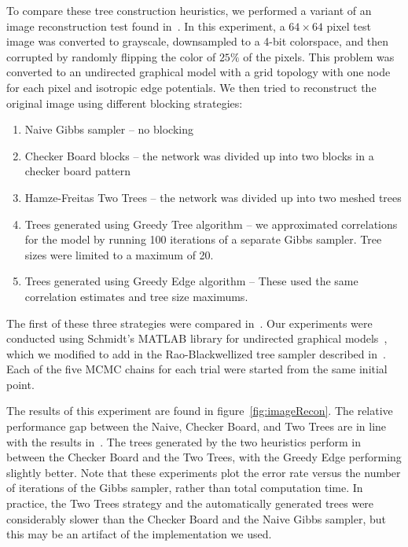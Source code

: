 \documentclass{article} %
\begin{document}

To compare these tree construction heuristics, we performed a variant of an
image reconstruction test found in~\cite{hamze2004fields}. In this experiment,
a $64\times64$ pixel test image was converted to grayscale, downsampled to a
4-bit colorspace, and then corrupted by randomly flipping the color of $25\%$
of the pixels. This problem was converted to an undirected graphical model with
a grid topology with one node for each pixel and isotropic edge potentials.  We
then tried to reconstruct the original image using different blocking strategies:

\begin{enumerate}
\item Naive Gibbs sampler -- no blocking
\item Checker Board blocks -- the network was divided up into two blocks in a checker board pattern
\item Hamze-Freitas Two Trees -- the network was divided up into two meshed trees
\item Trees generated using Greedy Tree algorithm -- we approximated correlations for the model by running 100 iterations of a separate Gibbs sampler. Tree sizes were limited to a maximum of 20.
\item Trees generated using Greedy Edge algorithm -- These used the same correlation estimates and tree size maximums.
\end{enumerate}

The first of these three strategies were compared in~\cite{hamze2004fields}.
Our experiments were conducted using Schmidt's MATLAB library for undirected
graphical models~\cite{schmidt07ugm}, which we modified to add in the
Rao-Blackwellized tree sampler described in~\cite{hamze2004fields}. Each of the
five MCMC chains for each trial were started from the same initial point.

The results of this experiment are found in figure~\ref{fig:imageRecon}. The
relative performance gap between the Naive, Checker Board, and Two Trees are in
line with the results in~\cite{hamze2004fields}. The trees generated by the two
heuristics perform in between the Checker Board and the Two Trees, with the
Greedy Edge performing slightly better. Note that these experiments plot the
error rate versus the number of iterations of the Gibbs sampler, rather than
total computation time. In practice, the Two Trees strategy and the
automatically generated trees were considerably slower than the Checker Board
and the Naive Gibbs sampler, but this may be an artifact of the implementation
we used.
\end{document}
